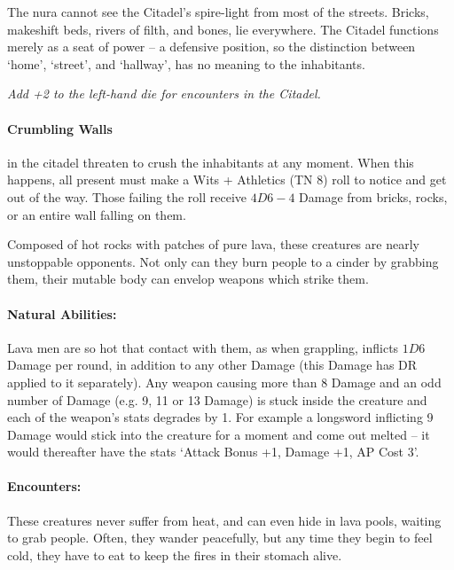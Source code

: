 \begin{multicols}{2}
The nura cannot see the Citadel's spire-light from most of the streets.
Bricks, makeshift beds, rivers of filth, and bones, lie everywhere.
The Citadel functions merely as a seat of power -- a defensive position, so the distinction between `home', `street', and `hallway', has no meaning to the inhabitants.

\textit{Add +2 to the left-hand die for encounters in the Citadel.}

\paragraph{Crumbling Walls}
in the citadel threaten to crush the inhabitants at any moment.
When this happens, all present must make a Wits + Athletics (TN 8) roll to notice and get out of the way.
Those failing the roll receive $4D6-4$ Damage from bricks, rocks, or an entire wall falling on them.

\label{lavaman}

Composed of hot rocks with patches of pure lava, these creatures are nearly unstoppable opponents.
Not only can they burn people to a cinder by grabbing them, their mutable body can envelop weapons which strike them.

\paragraph{Natural Abilities:} Lava men are so hot that contact with them, as when grappling, inflicts $1D6$ Damage per round, in addition to any other Damage (this Damage has DR applied to it separately).
Any weapon causing more than 8 Damage and an odd number of Damage (e.g. 9, 11 or 13 Damage) is stuck inside the creature and each of the weapon's stats degrades by 1.
For example a longsword inflicting 9 Damage would stick into the creature for a moment and come out melted -- it would thereafter have the stats `Attack Bonus +1, Damage +1, AP Cost 3'.

\paragraph{Encounters:} These creatures never suffer from heat, and can even hide in lava pools, waiting to grab people.
Often, they wander peacefully, but any time they begin to feel cold, they have to eat to keep the fires in their stomach alive.

\end{multicols}
